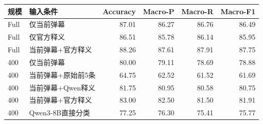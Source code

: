 \begin{tabular}{llrrrr}
\toprule
规模 & 输入条件 & Accuracy & Macro-P & Macro-R & Macro-F1 \\
\midrule
Full & 仅当前弹幕 & 87.01 & 86.27 & 86.76 & 86.49 \\
Full & 仅官方释义 & 86.51 & 85.78 & 86.14 & 85.95 \\
Full & 当前弹幕+官方释义 & 88.26 & 87.61 & 87.91 & 87.75 \\
400 & 仅当前弹幕 & 80.00 & 79.11 & 78.69 & 78.88 \\
400 & 当前弹幕+原始前5条 & 64.75 & 62.52 & 61.52 & 61.69 \\
400 & 当前弹幕+Qwen释义 & 81.75 & 80.95 & 80.58 & 80.75 \\
400 & 当前弹幕+官方释义 & 83.00 & 82.50 & 81.50 & 81.91 \\
400 & Qwen3-8B直接分类 & 77.25 & 76.30 & 75.41 & 75.77 \\
\bottomrule
\end{tabular}

